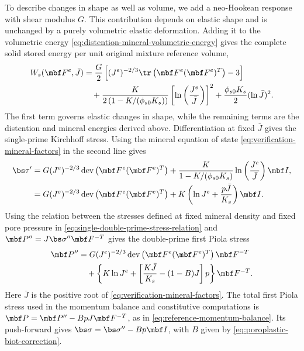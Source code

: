 To describe changes in shape as well as volume, we add a neo-Hookean
response with shear modulus \(G\).  This contribution depends on elastic
shape and is unchanged by a purely volumetric elastic deformation.  Adding
it to the volumetric energy
\eqref{eq:distention-mineral-volumetric-energy} gives the
complete solid stored energy per unit original mixture reference volume,
\begin{align*}
 W_s(\mbf F^e,\bar J)
 &=\frac{G}{2}\left[(J^e)^{-2/3}
 \tr\left(\mbf F^e(\mbf F^e)^T\right)-3\right] \\
 &\quad+\frac{K}{2\left(1-K/(\phi_{s0}K_s)\right)}
 \left[\ln\left(\frac{J^e}{\bar J}\right)\right]^2
 +\frac{\phi_{s0}K_s}{2}(\ln\bar J)^2.
\end{align*}
The first term governs elastic changes in shape, while the remaining terms are
the distention and mineral energies derived above.  Differentiation at fixed
\(\bar J\) gives the single-prime Kirchhoff stress.  Using the mineral equation of state
\eqref{eq:verification-mineral-factors} in the second line gives
\begin{align*}
 \bs\tau^{\prime}
 &=G(J^e)^{-2/3}
 \operatorname{dev}\left(\mbf F^e(\mbf F^e)^T\right)
 +\frac{K}{1-K/(\phi_{s0}K_s)}
 \ln\left(\frac{J^e}{\bar J}\right)\mbf I,
\\
 &=G(J^e)^{-2/3}
 \operatorname{dev}\left(\mbf F^e(\mbf F^e)^T\right)
 +K\left(\ln J^e+\frac{p\bar J}{K_s}\right)\mbf I.
\end{align*}
Using the relation between the stresses defined at fixed mineral density
and fixed pore pressure in
\eqref{eq:single-double-prime-stress-relation} and
\(\mbf P^{\prime\prime}=J\bs\sigma^{\prime\prime}\mbf F^{-T}\) gives the
double-prime first Piola stress
\begin{align}
 \mbf P^{\prime\prime}
 &=G(J^e)^{-2/3}
 \operatorname{dev}\left(\mbf F^e(\mbf F^e)^T\right)\mbf F^{-T} \notag\\
 &\quad+\left\{K\ln J^e
 +\left[\frac{K\bar J}{K_s}-(1-B)J\right]p\right\}\mbf F^{-T}.
 \label{eq:matched-logarithmic-double-prime-stress}
\end{align}
Here \(\bar J\) is the positive root of
\eqref{eq:verification-mineral-factors}.  The total first Piola stress used in
the momentum balance and constitutive computations is
\(\mbf P=\mbf P^{\prime\prime}-BpJ\mbf F^{-T}\), as in
\eqref{eq:reference-momentum-balance}.  Its push-forward gives
\(\bs\sigma=\bs\sigma^{\prime\prime}-Bp\mbf I\), with \(B\) given by
\eqref{eq:poroplastic-biot-correction}.

